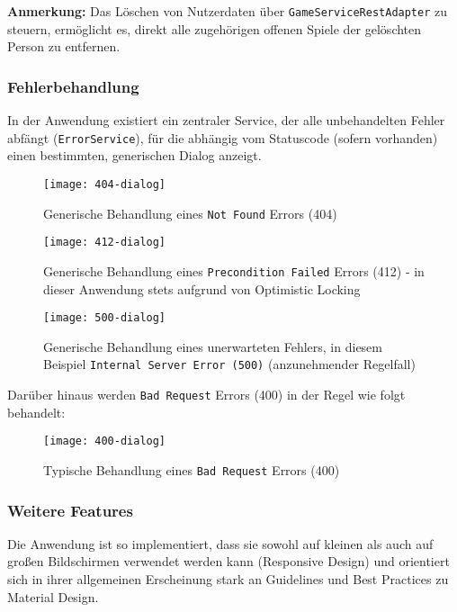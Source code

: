 \textbf{Anmerkung:} Das Löschen von Nutzerdaten über \texttt{GameServiceRestAdapter} zu steuern, ermöglicht es, direkt
alle zugehörigen offenen Spiele der gelöschten Person zu entfernen.

\subsubsection{Fehlerbehandlung}

In der Anwendung existiert ein zentraler Service, der alle unbehandelten Fehler abfängt (\texttt{ErrorService}), für die abhängig vom Statuscode (sofern vorhanden) einen
bestimmten, generischen Dialog anzeigt.

\begin{figure}[H]
    \centering
    \texttt{[image: 404-dialog]}
    \caption[]{Generische Behandlung eines \texttt{Not Found} Errors (404)}
    \label{fig:404}
\end{figure}

\begin{figure}[H]
    \centering
    \texttt{[image: 412-dialog]}
    \caption[]{Generische Behandlung eines \texttt{Precondition Failed} Errors (412) - in dieser Anwendung stets aufgrund von Optimistic Locking}
    \label{fig:412}
\end{figure}

\begin{figure}[H]
    \centering
    \texttt{[image: 500-dialog]}
    \caption[]{Generische Behandlung eines unerwarteten Fehlers, in diesem Beispiel \texttt{Internal Server Error (500)} (anzunehmender Regelfall)}
    \label{fig:500}
\end{figure}

Darüber hinaus werden \texttt{Bad Request} Errors (400) in der Regel wie folgt behandelt:

\begin{figure}[H]
    \centering
    \texttt{[image: 400-dialog]}
    \caption[]{Typische Behandlung eines \texttt{Bad Request} Errors (400)}
    \label{fig:400}
\end{figure}

\subsubsection{Weitere Features}

Die Anwendung ist so implementiert, dass sie sowohl auf kleinen als auch auf großen Bildschirmen verwendet werden kann (Responsive Design)
und orientiert sich in ihrer allgemeinen Erscheinung stark an Guidelines und Best Practices zu Material Design.

